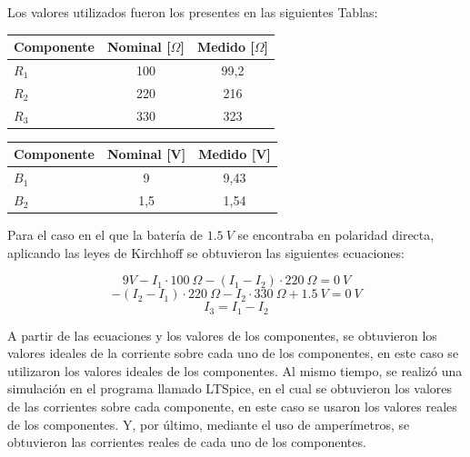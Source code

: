 Los valores utilizados fueron los presentes en las siguientes Tablas:

\begin{table}[H]
\centering
\begin{tabular}{|l|c|c|}
\hline
\rowcolor{blue!30} \textbf{Componente} & \textbf{Nominal [$\Omega$]} & \textbf{Medido [$\Omega$]} \\
\hline
$R_1$ & 100 & 99,2 \\
$R_2$ & 220 & 216  \\
$R_3$ & 330 & 323  \\
\hline
\end{tabular}
\label{tab:resistencias_nom}
\end{table}

\begin{table}[H]
\centering
\begin{tabular}{|l|c|c|}
\hline
\rowcolor{blue!30} \textbf{Componente} & \textbf{Nominal [V]} & \textbf{Medido [V]} \\
\hline
$B_1$ & 9   & 9,43 \\
$B_2$ & 1,5 & 1,54 \\
\hline
\end{tabular}
\label{tab:baterias_nom}
\end{table}

Para el caso en el que la batería de $1.5\ V$ se encontraba en polaridad directa, aplicando las leyes de Kirchhoff se obtuvieron las siguientes ecuaciones:

\begin{equation*}
    9V-I_1 \cdot100\ \Omega-(I_1-I_2) \cdot 220\ \Omega = 0\ V    
\end{equation*}
\begin{equation*}
    -(I_2-I_1)\cdot 220\ \Omega -I_2\cdot 330\ \Omega +1.5\ V = 0\ V   
\end{equation*}
\begin{equation*}
    I_3 = I_1 - I_2 
\end{equation*}


A partir de las ecuaciones y los valores de los componentes, se obtuvieron los valores ideales de la corriente sobre cada uno de los componentes, en este caso se utilizaron los valores ideales de los componentes. Al mismo tiempo, se realizó una simulación en el programa llamado LTSpice, en el cual se obtuvieron los valores de las corrientes sobre cada componente, en este caso se usaron los valores reales de los componentes. Y, por último, mediante el uso de amperímetros, se obtuvieron las corrientes reales de cada uno de los componentes.


